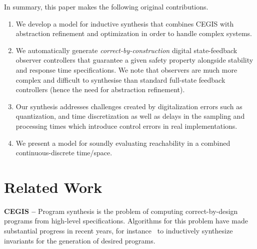 \documentclass[sigconf]{llncs}
\renewcommand{\note}[1]{\textcolor{red}{[#1]}}
\begin{document}
In summary, this paper makes the following original contributions.
%
\begin{enumerate}
\item We develop a model for inductive synthesis that combines CEGIS with
  abstraction refinement and optimization in order to handle complex
  systems. 
%
\item We automatically generate \emph{correct-by-construction} digital
  state-feedback observer controllers that guarantee a given safety property
  alongside stability and response time specifications.  We note that
  observers are much more complex and difficult to synthesise than standard
  full-state feedback controllers (hence the need for abstraction refinement).
%
\item  Our synthesis addresses challenges created by digitalization errors
 such as quantization, and time discretization as well as delays in the
 sampling and processing times which introduce control errors in real
 implementations.
 \item We present a model for soundly evaluating reachability in a combined 
 continuous-discrete time/space. 
\end{enumerate}


\section{Related Work}
\label{sec:relw}

\textbf{CEGIS --}
Program synthesis is the problem of computing correct-by-design programs
from high-level specifications.  Algorithms for this problem have made
substantial progress in recent years, for instance~\cite{itzhaky2010simple}
to inductively synthesize invariants for the generation of desired programs.
\end{document}
